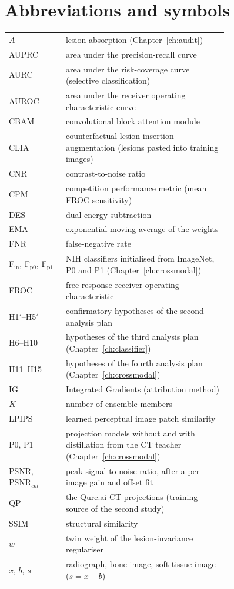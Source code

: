 \documentclass[11pt,a4paper,openany]{report}
\begin{document}
\chapter*{Abbreviations and symbols}
\begin{longtable}{@{}lp{0.74\linewidth}@{}}
$A$ & lesion absorption (Chapter~\ref{ch:audit}) \\
AUPRC & area under the precision-recall curve \\
AURC & area under the risk-coverage curve (selective classification) \\
AUROC & area under the receiver operating characteristic curve \\
CBAM & convolutional block attention module \\
CLIA & counterfactual lesion insertion augmentation (lesions pasted into training images) \\
CNR & contrast-to-noise ratio \\
CPM & competition performance metric (mean FROC sensitivity) \\
DES & dual-energy subtraction \\
EMA & exponential moving average of the weights \\
FNR & false-negative rate \\
F$_\mathrm{in}$, F$_\mathrm{p0}$, F$_\mathrm{p1}$ & NIH classifiers initialised from ImageNet, P0 and P1 (Chapter~\ref{ch:crossmodal}) \\
FROC & free-response receiver operating characteristic \\
H1$'$--H5$'$ & confirmatory hypotheses of the second analysis plan \\
H6--H10 & hypotheses of the third analysis plan (Chapter~\ref{ch:classifier}) \\
H11--H15 & hypotheses of the fourth analysis plan (Chapter~\ref{ch:crossmodal}) \\
IG & Integrated Gradients (attribution method) \\
$K$ & number of ensemble members \\
LPIPS & learned perceptual image patch similarity \\
P0, P1 & projection models without and with distillation from the CT teacher (Chapter~\ref{ch:crossmodal}) \\
PSNR, PSNR$_{cal}$ & peak signal-to-noise ratio, after a per-image gain and offset fit \\
QP & the Qure.ai CT projections (training source of the second study) \\
SSIM & structural similarity \\
$w$ & twin weight of the lesion-invariance regulariser \\
$x$, $b$, $s$ & radiograph, bone image, soft-tissue image ($s=x-b$) \\
\end{longtable}
\end{document}
